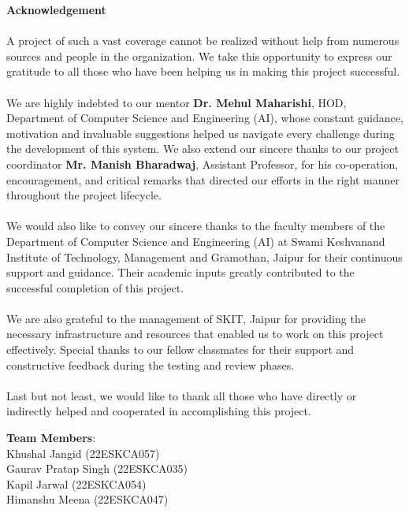 \begin{center}
\thispagestyle{fancy}
\LARGE{\textbf{Acknowledgement}}
\end{center}
\linespread{1.33}
\large{\paragraph{}A project of such a vast coverage cannot be realized without help from numerous sources and people in the organization. We take this opportunity to express our gratitude to all those who have been helping us in making this project successful.}

\large{\paragraph{} We are highly indebted to our mentor \textbf{Dr. Mehul Maharishi}, HOD, Department of Computer Science and Engineering (AI), whose constant guidance, motivation and invaluable suggestions helped us navigate every challenge during the development of this system. We also extend our sincere thanks to our project coordinator \textbf{Mr. Manish Bharadwaj}, Assistant Professor, for his co-operation, encouragement, and critical remarks that directed our efforts in the right manner throughout the project lifecycle.}

\large{\paragraph{}We would also like to convey our sincere thanks to the faculty members of the Department of Computer Science and Engineering (AI) at Swami Keshvanand Institute of Technology, Management and Gramothan, Jaipur for their continuous support and guidance. Their academic inputs greatly contributed to the successful completion of this project.}

\large{\paragraph{}We are also grateful to the management of SKIT, Jaipur for providing the necessary infrastructure and resources that enabled us to work on this project effectively. Special thanks to our fellow classmates for their support and constructive feedback during the testing and review phases.}

\large{\paragraph{}Last but not least, we would like to thank all those who have directly or indirectly helped and cooperated in accomplishing this project.} \newline
\large{\textbf{Team Members}}:\\
Khushal Jangid (22ESKCA057)\\
Gaurav Pratap Singh (22ESKCA035)\\
Kapil Jarwal (22ESKCA054)\\
Himanshu Meena (22ESKCA047)\\
\newpage
